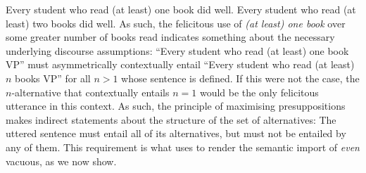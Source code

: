 \pex\label{ex:maxpresup2}
\a\ljudge{\#} Every student who read (at least) one book did well.
\a Every student who read (at least) two books did well.
\xe
As such, the felicitous use of \textit{(at least) one book} over some greater number of books read indicates something about the necessary underlying discourse assumptions: \enquote{Every student who read (at least) one book VP} must asymmetrically contextually entail \enquote{Every student who read (at least) $n$ books VP} for all $n>1$ whose sentence is defined. If this were not the case, the $n$-alternative that contextually entails $n=1$ would be the only felicitous utterance in this context. As such, the principle of maximising presuppositions makes indirect statements about the structure of the set of alternatives: The uttered sentence must entail all of its alternatives, but must not be entailed by any of them. This requirement is what \textcite{Crnic2014-dogma} uses to render the semantic import of \textit{even} vacuous, as we now show.

